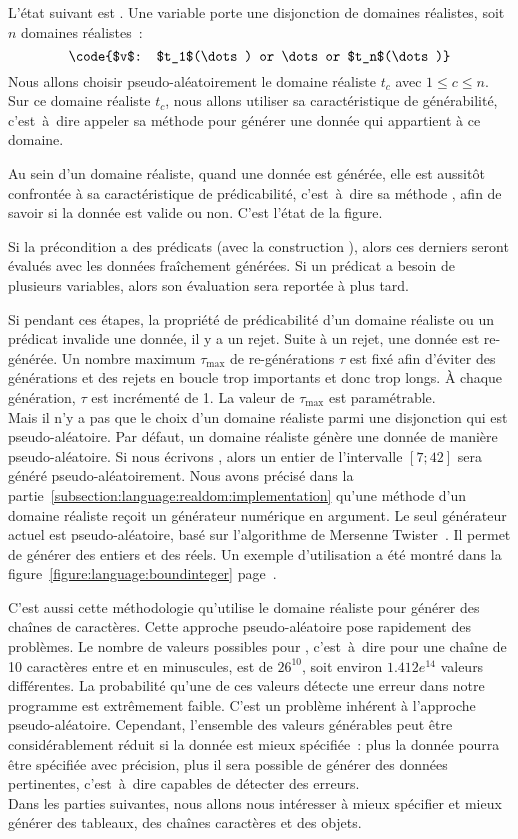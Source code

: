 L'état suivant est . Une variable porte une disjonction de domaines
réalistes, soit $n$ domaines réalistes~:
%
$$\code{$v$: $t_1$(\dots) or \dots or $t_n$(\dots)}$$
%
Nous allons choisir pseudo-aléatoirement le domaine réaliste $t_c$ avec $1 \leq
c \leq n$. Sur ce domaine réaliste $t_c$, nous allons utiliser sa
caractéristique de générabilité, c'est~à~dire appeler sa méthode 
pour générer une donnée qui appartient à ce domaine.

Au sein d'un domaine réaliste, quand une donnée est générée, elle est aussitôt
confrontée à sa caractéristique de prédicabilité, c'est~à~dire sa méthode
, afin de savoir si la donnée est valide ou non. C'est l'état
 de la figure.

Si la précondition a des prédicats (avec la construction ), alors ces
derniers seront évalués avec les données fraîchement générées. Si un prédicat a
besoin de plusieurs variables, alors son évaluation sera reportée à plus tard.

Si pendant ces étapes, la propriété de prédicabilité d'un domaine réaliste ou un
prédicat invalide une donnée, il y a un {\strong rejet}. Suite à un rejet, une
donnée est re-générée. Un nombre maximum $\tau_\mathrm{max}$ de re-générations
$\tau$ est fixé afin d'éviter des générations et des rejets en boucle trop
importants et donc trop longs. À chaque génération, $\tau$ est incrémenté de 1.
La valeur de $\tau_\mathrm{max}$ est paramétrable. \\

Mais il n'y a pas que le choix d'un domaine réaliste parmi une disjonction qui
est pseudo-aléatoire. Par défaut, un domaine réaliste génère une donnée de
manière pseudo-aléatoire.  Si nous écrivons , alors un
entier de l'intervalle $[7; 42]$ sera généré pseudo-aléatoirement. Nous avons
précisé dans la partie~\ref{subsection:language:realdom:implementation} qu'une
méthode  d'un domaine réaliste reçoit un générateur numérique en
argument. Le seul générateur actuel est pseudo-aléatoire, basé sur l'algorithme
de Mersenne Twister~. Il permet de générer des entiers et
des réels. Un exemple d'utilisation a été montré dans la
figure~\ref{figure:language:boundinteger}
page~\pageref{figure:language:boundinteger}.

C'est aussi cette méthodologie qu'utilise le domaine réaliste  pour
générer des chaînes de caractères. Cette approche pseudo-aléatoire pose
rapidement des problèmes. Le nombre de valeurs possibles pour , c'est~à~dire pour une chaîne de 10 caractères entre  et
 en minuscules, est de $26^{10}$, soit environ $1.412e^{14}$ valeurs
différentes. La probabilité qu'une de ces valeurs détecte une erreur dans notre
programme est extrêmement faible. C'est un problème inhérent à l'approche
pseudo-aléatoire. Cependant, l'ensemble des valeurs générables peut être
considérablement réduit si la donnée est mieux spécifiée~: plus la donnée pourra
être spécifiée avec précision, plus il sera possible de générer des données
pertinentes, c'est~à~dire capables de détecter des erreurs. \\

Dans les parties suivantes, nous allons nous intéresser à mieux spécifier et
mieux générer des tableaux, des chaînes caractères et des objets.
